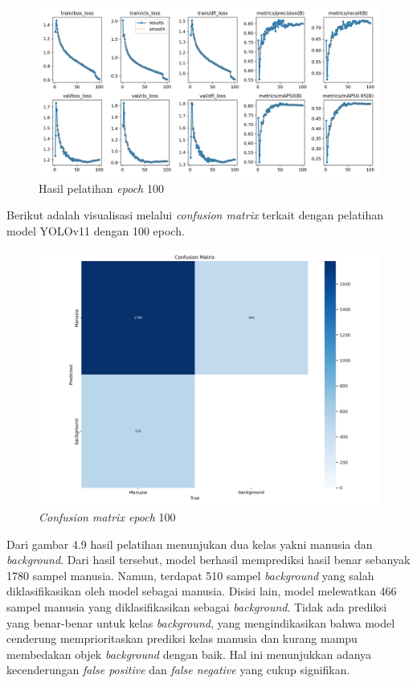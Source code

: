 \begin{figure} [H] \centering
  \includegraphics[scale=0.28]{gambar/hasil-epoch 100.png}
  \caption{Hasil pelatihan \emph{epoch} 100}
  \label{fig:hasil epoch 100}
\end{figure}

Berikut adalah visualisasi melalui \emph{confusion matrix} terkait dengan pelatihan model YOLOv11 dengan 100 epoch.
\begin{figure} [H] \centering
  \includegraphics[scale=0.22]{gambar/confusion_matrix-epoch 100.png}
  \caption{ \emph{Confusion matrix epoch} 100}
  \label{fig:Cm epoch 100}
\end{figure}
Dari gambar 4.9 hasil pelatihan menunjukan dua kelas yakni manusia dan \emph{background}.
Dari hasil tersebut, model berhasil memprediksi hasil benar sebanyak 1780 sampel manusia. 
Namun, terdapat 510 sampel \emph{background} yang salah diklasifikasikan oleh model sebagai manusia. Disisi lain, model melewatkan 
466 sampel manusia yang diklasifikasikan sebagai \emph{background}. Tidak ada prediksi yang benar-benar untuk kelas \emph{background}, yang mengindikasikan bahwa model cenderung memprioritaskan prediksi kelas manusia dan kurang mampu membedakan objek \emph{background} dengan baik. Hal ini menunjukkan adanya kecenderungan \emph{false positive} dan \emph{false negative} yang cukup signifikan.

